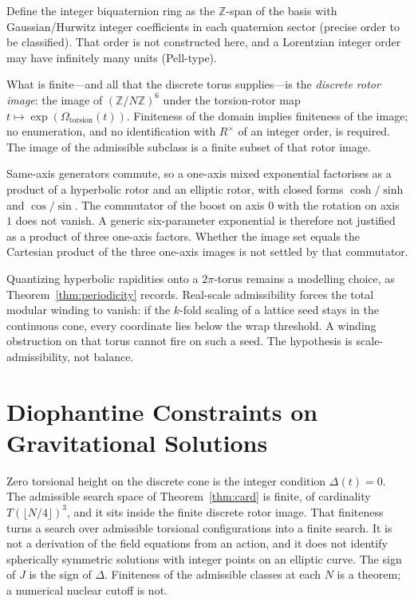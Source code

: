 \documentclass[a4paper]{article}
\theoremstyle{definition}
\begin{document}
Define the integer biquaternion ring as the $\mathbb{Z}$-span of the basis with Gaussian/Hurwitz integer coefficients in each quaternion sector (precise order to be classified). That order is not constructed here, and a Lorentzian integer order may have infinitely many units (Pell-type).

What is finite---and all that the discrete torus supplies---is the \emph{discrete rotor image}: the image of $(\mathbb{Z}/N\mathbb{Z})^6$ under the torsion-rotor map $t\mapsto\exp(\Omega_{\mathrm{torsion}}(t))$. Finiteness of the domain implies finiteness of the image; no enumeration, and no identification with $R^\times$ of an integer order, is required. The image of the admissible subclass is a finite subset of that rotor image.

Same-axis generators commute, so a one-axis mixed exponential factorises as a product of a hyperbolic rotor and an elliptic rotor, with closed forms $\cosh/\sinh$ and $\cos/\sin$. The commutator of the boost on axis $0$ with the rotation on axis $1$ does not vanish. A generic six-parameter exponential is therefore not justified as a product of three one-axis factors. Whether the image set equals the Cartesian product of the three one-axis images is not settled by that commutator.

Quantizing hyperbolic rapidities onto a $2\pi$-torus remains a modelling choice, as Theorem~\ref{thm:periodicity} records. Real-scale admissibility forces the total modular winding to vanish: if the $k$-fold scaling of a lattice seed stays in the continuous cone, every coordinate lies below the wrap threshold. A winding obstruction on that torus cannot fire on such a seed. The hypothesis is scale-admissibility, not balance.

\section{Diophantine Constraints on Gravitational Solutions}
\label{sec:diophantine}

Zero torsional height on the discrete cone is the integer condition $\Delta(t)=0$. The admissible search space of Theorem~\ref{thm:card} is finite, of cardinality $T(\lfloor N/4\rfloor)^3$, and it sits inside the finite discrete rotor image. That finiteness turns a search over admissible torsional configurations into a finite search. It is not a derivation of the field equations from an action, and it does not identify spherically symmetric solutions with integer points on an elliptic curve. The sign of $J$ is the sign of $\Delta$. Finiteness of the admissible classes at each $N$ is a theorem; a numerical nuclear cutoff is not.
\end{document}
